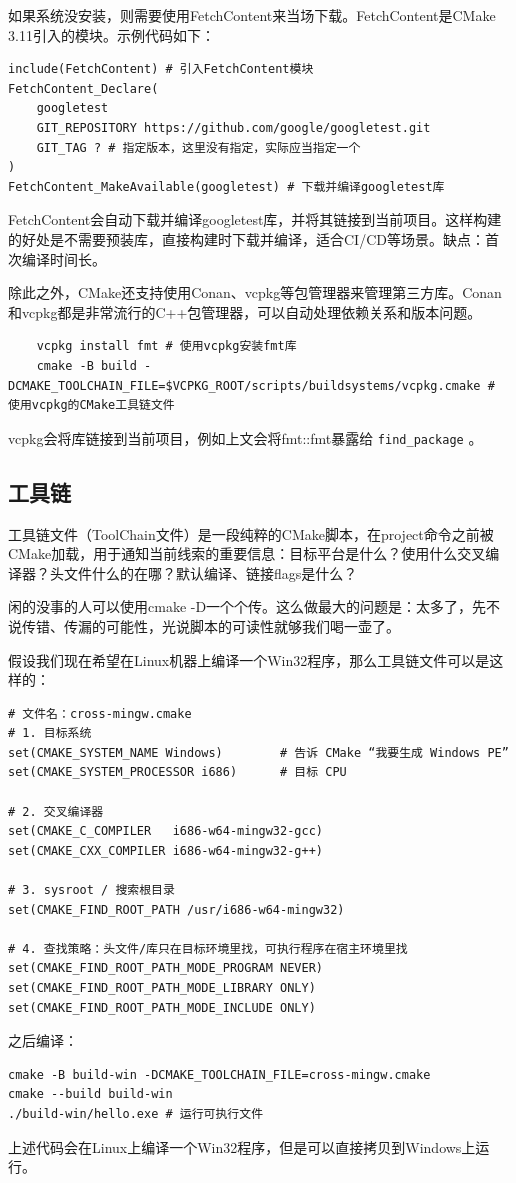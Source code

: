 如果系统没安装，则需要使用FetchContent来当场下载。FetchContent是CMake 3.11引入的模块。示例代码如下：
\begin{verbatim}
include(FetchContent) # 引入FetchContent模块
FetchContent_Declare(
    googletest
    GIT_REPOSITORY https://github.com/google/googletest.git
    GIT_TAG ? # 指定版本，这里没有指定，实际应当指定一个
)
FetchContent_MakeAvailable(googletest) # 下载并编译googletest库
\end{verbatim}
FetchContent会自动下载并编译googletest库，并将其链接到当前项目。这样构建的好处是不需要预装库，直接构建时下载并编译，适合CI/CD等场景。缺点：首次编译时间长。

除此之外，CMake还支持使用Conan、vcpkg等包管理器来管理第三方库。Conan和vcpkg都是非常流行的C++包管理器，可以自动处理依赖关系和版本问题。
\begin{verbatim}
    vcpkg install fmt # 使用vcpkg安装fmt库
    cmake -B build -DCMAKE_TOOLCHAIN_FILE=$VCPKG_ROOT/scripts/buildsystems/vcpkg.cmake # 使用vcpkg的CMake工具链文件
\end{verbatim}
vcpkg会将库链接到当前项目，例如上文会将fmt::fmt暴露给 \texttt{find\_package} 。

\subsection{工具链}

工具链文件（ToolChain文件）是一段纯粹的CMake脚本，在project命令之前被CMake加载，用于通知当前线索的重要信息：目标平台是什么？使用什么交叉编译器？头文件什么的在哪？默认编译、链接flags是什么？

闲的没事的人可以使用cmake -D一个个传。这么做最大的问题是：太多了，先不说传错、传漏的可能性，光说脚本的可读性就够我们喝一壶了。

假设我们现在希望在Linux机器上编译一个Win32程序，那么工具链文件可以是这样的：
\begin{verbatim}
# 文件名：cross-mingw.cmake
# 1. 目标系统
set(CMAKE_SYSTEM_NAME Windows)        # 告诉 CMake “我要生成 Windows PE”
set(CMAKE_SYSTEM_PROCESSOR i686)      # 目标 CPU

# 2. 交叉编译器
set(CMAKE_C_COMPILER   i686-w64-mingw32-gcc)
set(CMAKE_CXX_COMPILER i686-w64-mingw32-g++)

# 3. sysroot / 搜索根目录
set(CMAKE_FIND_ROOT_PATH /usr/i686-w64-mingw32)

# 4. 查找策略：头文件/库只在目标环境里找，可执行程序在宿主环境里找
set(CMAKE_FIND_ROOT_PATH_MODE_PROGRAM NEVER)
set(CMAKE_FIND_ROOT_PATH_MODE_LIBRARY ONLY)
set(CMAKE_FIND_ROOT_PATH_MODE_INCLUDE ONLY)
\end{verbatim}
之后编译：
\begin{verbatim}
cmake -B build-win -DCMAKE_TOOLCHAIN_FILE=cross-mingw.cmake
cmake --build build-win
./build-win/hello.exe # 运行可执行文件
\end{verbatim}
上述代码会在Linux上编译一个Win32程序，但是可以直接拷贝到Windows上运行。

